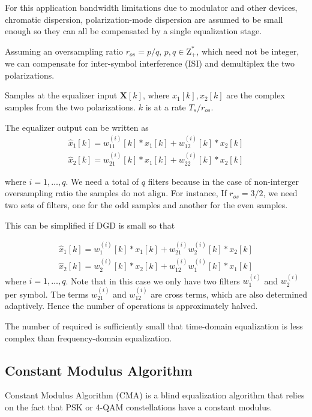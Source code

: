 \documentclass[a4paper]{article}
\begin{document}
For this application bandwidth limitations due to modulator and other devices, chromatic dispersion, polarization-mode dispersion are assumed to be small enough so they can all be compensated by a single equalization stage. 

Assuming an oversampling ratio $r_{os} = p/q$, $p, q \in \mathrm{Z^*_+}$, which need not be integer, we can compensate for inter-symbol interference (ISI) and demultiplex the two polarizations.

Samples at the equalizer input $\bm{X}[k]$, where $x_1[k], x_2[k]$ are the complex samples from the two polarizations. $k$ is at a rate $T_s/r_{os}$.

The equalizer output can be written as
\begin{align}
\hat{x}_{1}[k] = w^{(i)}_{11}[k]\ast x_1[k] + w^{(i)}_{12}[k]\ast x_2[k] \\
\hat{x}_{2}[k] = w^{(i)}_{21}[k]\ast x_1[k] + w^{(i)}_{22}[k]\ast x_2[k]
\end{align}

where $i = 1, \ldots, q$. We need a total of $q$ filters because in the case of non-interger oversampling ratio the samples do not align. For instance, If $r_{os} = 3/2$, we need two sets of filters, one for the odd samples and another for the even samples.

This can be simplified if DGD is small so that 

\begin{align}
\hat{x}_{1}[k] = w^{(i)}_{1}[k]\ast x_1[k] + w_{21}^{(i)}w^{(i)}_{2}[k]\ast x_2[k] \\
\hat{x}_{2}[k] = w^{(i)}_{2}[k]\ast x_2[k] + w_{12}^{(i)}w^{(i)}_{1}[k]\ast x_1[k]
\end{align}
where $i = 1, \ldots, q$. Note that in this case we only have two filters $w^{(i)}_{1}$ and $w^{(i)}_{2}$ per symbol. The terms $w_{21}^{(i)}$ and $w_{12}^{(i)}$ are cross terms, which are also determined adaptively. Hence the number of operations is approximately halved.

The number of required is sufficiently small that time-domain equalization is less complex than frequency-domain equalization.

\subsection{Constant Modulus Algorithm}

Constant Modulus Algorithm (CMA) is a blind equalization algorithm that relies on the fact that PSK or 4-QAM constellations have a constant modulus. 
\end{document}
